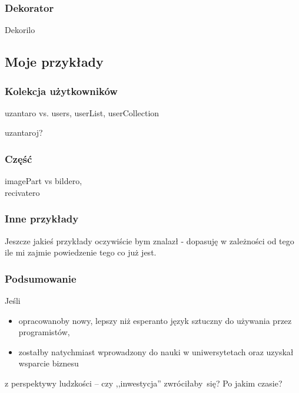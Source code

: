 \documentclass{beamer}
\begin{document}
  \begin{frame}
  \frametitle{Dekorator}
  Dekorilo
  \end{frame}  
  
  \subsection{Moje przykłady}
  \begin{frame}
  	\frametitle{Kolekcja użytkowników}

	uzantaro vs. users, userList, userCollection
	
	uzantaroj?
  \end{frame}
  
  \begin{frame}
  	\frametitle{Część}

	imagePart vs bildero,\\
	recivatero
  \end{frame}
  
  \begin{frame}
    \frametitle{Inne przykłady}
	
	Jeszcze jakieś przykłady oczywiście bym znalazł - dopasuję w zależności od tego ile mi zajmie powiedzenie tego co już jest.
  \end{frame}  
  
  \begin{frame}
  	\frametitle{Podsumowanie}
  	Jeśli 
  	\begin{itemize}
  		\item opracowanoby nowy, lepszy niż esperanto język sztuczny do używania przez programistów,
  		\item zostałby natychmiast wprowadzony do nauki w uniwersytetach oraz uzyskał wsparcie biznesu
  	\end{itemize}
  	
  	z perspektywy ludzkości -- czy ,,inwestycja'' zwróciłaby~się? Po jakim czasie?
  \end{frame}
\end{document}
